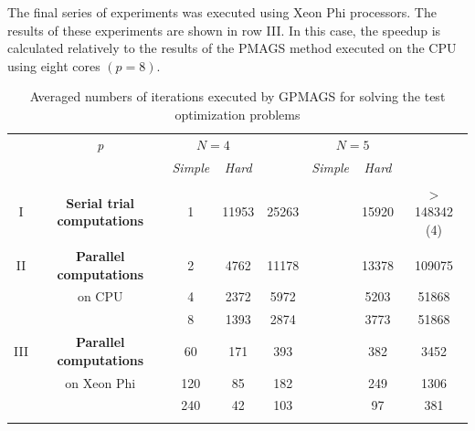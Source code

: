 \documentclass{naco}
\theoremstyle{definition}
\begin{document}
The final series of experiments was executed using Xeon Phi processors. The results
of these experiments are shown in row III. In this case, the speedup is
calculated relatively to the results of the PMAGS method executed on the CPU using eight cores \((p=8)\).

\begin{table}
  \centering
  \caption{Averaged numbers of iterations executed by GPMAGS for solving the test optimization problems}
  \label{tab:4}
  \begin{tabular}{cccccccc}
    \cline{3-8}\noalign{\smallskip}
    \multicolumn{2}{c}{  } & \textit{p} & \multicolumn{2}{c}{$N=4$} & & \multicolumn{2}{c}{$N=5$}   \\
    \noalign{\smallskip} \cline{4-5} \cline{7-8}  \noalign{\smallskip}
    \multicolumn{2}{c}{  } & & \textit{Simple} & \textit{Hard} & & \textit{Simple} & \textit{Hard}  \\
    \noalign{\smallskip}\hline
    I &
    \parbox{0.25\textwidth}{
    \begin{center}
    \textbf{Serial trial computations}
    \end{center}		}
      & 1 & 11953 & 25263 & & 15920 & \(>\)148342 (4)  \\
    \hline \noalign{\smallskip}
II  & \textbf{Parallel computations}  %
  & 2 & 4762 & 11178 & & 13378 & 109075 \\
& on CPU & 4 & 2372 & 5972 & & 5203 & 51868 \\
&  & 8 & 1393 & 2874 & & 3773 & 51868 \\
    \noalign{\smallskip}\hline	\noalign{\smallskip}
III & \textbf{Parallel computations} %
  & 60  & 171 & 393 & & 382 & 3452  \\
& on Xeon Phi  & 120 & 85 & 182 & & 249 & 1306 \\
&  & 240 & 42 & 103 & & 97 & 381 \\

    \noalign{\smallskip}\hline
  \end{tabular}
\end{table}
\end{document}
